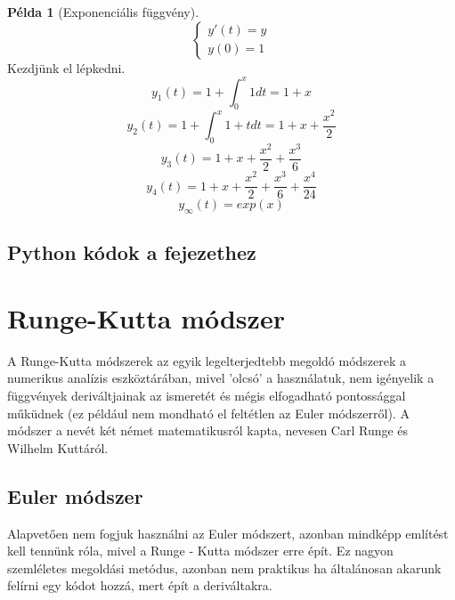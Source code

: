 \documentclass{article}
\theoremstyle{definition}
\theoremstyle{theorem}
\newtheorem{example}{Példa}
\begin{document}
\begin{example}[Exponenciális függvény]
\begin{equation*}
    \begin{cases}
       y'(t) = y\\
       y(0) = 1
    \end{cases}
\end{equation*}
Kezdjünk el lépkedni.
\begin{equation*}
    y_1(t) = 1 + \int_0^x 1 dt = 1 + x
\end{equation*}
\begin{equation*}
    y_2(t) = 1 + \int_0^x 1+t dt = 1 + x + \frac{x^2}{2}
\end{equation*}
\begin{equation*}
    y_3(t) =  1 + x + \frac{x^2}{2} + \frac{x^3}{6}
\end{equation*}
\begin{equation*}
    y_4(t) = 1 + x + \frac{x^2}{2} + \frac{x^3}{6} + \frac{x^4}{24}
\end{equation*}
\begin{equation*}
    y_{\infty}(t) = exp(x)
\end{equation*}
\end{example}
\subsection{Python kódok a fejezethez}

\section{Runge-Kutta módszer}
A Runge-Kutta módszerek az egyik legelterjedtebb megoldó módszerek a numerikus analízis eszköztárában, mivel 'olcsó' a használatuk, nem igényelik a függvények deriváltjainak az ismeretét és mégis elfogadható pontossággal műküdnek (ez például nem mondható el feltétlen az Euler módszerről). A módszer a nevét két német matematikusról kapta, nevesen Carl Runge és Wilhelm Kuttáról.

\subsection{Euler módszer}
Alapvetően nem fogjuk használni az Euler módszert, azonban mindképp említést kell tennünk róla, mivel a Runge - Kutta módszer erre épít. Ez nagyon szemléletes megoldási metódus, azonban nem praktikus ha általánosan akarunk felírni egy kódot hozzá, mert épít a deriváltakra.\\
\end{document}

